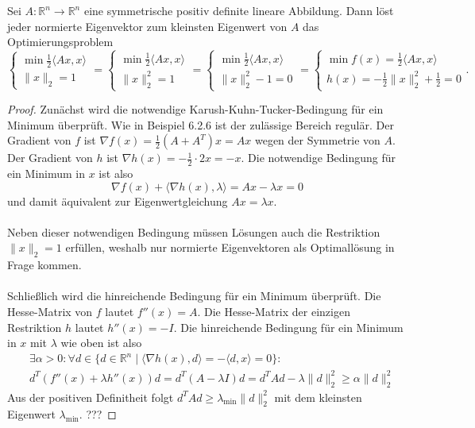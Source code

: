 
Sei $A:\mathbb R^n\to \mathbb R^n$ eine symmetrische positiv definite lineare Abbildung. Dann löst jeder normierte Eigenvektor zum kleinsten Eigenwert von $A$ das Optimierungsproblem $$\begin{cases}\min \frac{1}{2}\langle Ax, x\rangle\\\|x\|_2=1\end{cases}=\begin{cases}\min \frac{1}{2}\langle Ax, x\rangle\\\|x\|_2^2=1\end{cases}=\begin{cases}\min \frac{1}{2}\langle Ax, x\rangle\\\|x\|_2^2-1=0\end{cases}=\begin{cases}\min f(x)=\frac{1}{2}\langle Ax, x\rangle\\h(x)=-\frac{1}{2}\|x\|_2^2+\frac{1}{2}=0\end{cases}.$$
\begin{proof}
Zunächst wird die notwendige Karush-Kuhn-Tucker-Bedingung für ein Minimum überprüft. Wie in Beispiel 6.2.6 ist der zulässige Bereich regulär. Der Gradient von $f$ ist $\nabla f(x)=\frac{1}{2}(A+A^T)x=Ax$ wegen der Symmetrie von $A$. Der Gradient von $h$ ist $\nabla h(x)=-\frac{1}{2}\cdot 2x=-x$. Die notwendige Bedingung für ein Minimum in $x$ ist also
$$\nabla f(x)+\langle \nabla h(x),\lambda\rangle=Ax -\lambda x=0$$
und damit äquivalent zur Eigenwertgleichung $Ax=\lambda x$.\\\\
Neben dieser notwendigen Bedingung müssen Lösungen auch die Restriktion $\|x\|_2=1$ erfüllen, weshalb nur normierte Eigenvektoren als Optimallösung in Frage kommen.\\\\
Schließlich wird die hinreichende Bedingung für ein Minimum überprüft. Die Hesse-Matrix von $f$ lautet $f''(x)=A$. Die Hesse-Matrix der einzigen Restriktion $h$ lautet $h''(x)=-I$. Die hinreichende Bedingung für ein Minimum in $x$ mit $\lambda$ wie oben ist also
\begin{align*}
&\exists \alpha>0:\forall d\in \{d\in\mathbb R^n\mid \langle \nabla h(x),d\rangle=-\langle d,x\rangle=0\}:\\
&d^T(f''(x)+\lambda h''(x))d=d^T(A-\lambda I)d=d^TAd-\lambda \|d\|_2^2\geq\alpha\|d\|_2^2\end{align*}
Aus der positiven Definitheit folgt $d^TAd\geq\lambda_{\min}\|d\|_2^2$ mit dem kleinsten Eigenwert $\lambda_{\min}$.
???
\end{proof}